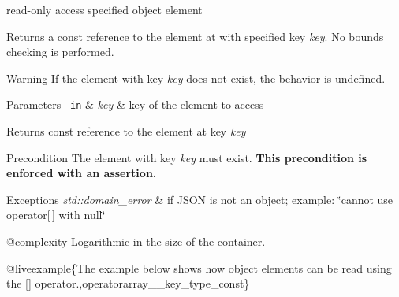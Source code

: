 read-\/only access specified object element 

Returns a const reference to the element at with specified key {\itshape key}. No bounds checking is performed.

\begin{DoxyWarning}{Warning}
If the element with key {\itshape key} does not exist, the behavior is undefined.
\end{DoxyWarning}

\begin{DoxyParams}[1]{Parameters}
\mbox{\texttt{ in}}  & {\em key} & key of the element to access\\
\hline
\end{DoxyParams}
\begin{DoxyReturn}{Returns}
const reference to the element at key {\itshape key} 
\end{DoxyReturn}
\begin{DoxyPrecond}{Precondition}
The element with key {\itshape key} must exist. {\bfseries{This precondition is enforced with an assertion.}}
\end{DoxyPrecond}

\begin{DoxyExceptions}{Exceptions}
{\em std\+::domain\+\_\+error} & if J\+S\+ON is not an object; example\+: {\ttfamily \char`\"{}cannot use
operator\mbox{[}$\,$\mbox{]} with null\char`\"{}}\\
\hline
\end{DoxyExceptions}
@complexity Logarithmic in the size of the container.

@liveexample\{The example below shows how object elements can be read using the {\ttfamily \mbox{[}\mbox{]}} operator.,operatorarray\+\_\+\+\_\+key\+\_\+type\+\_\+const\}

